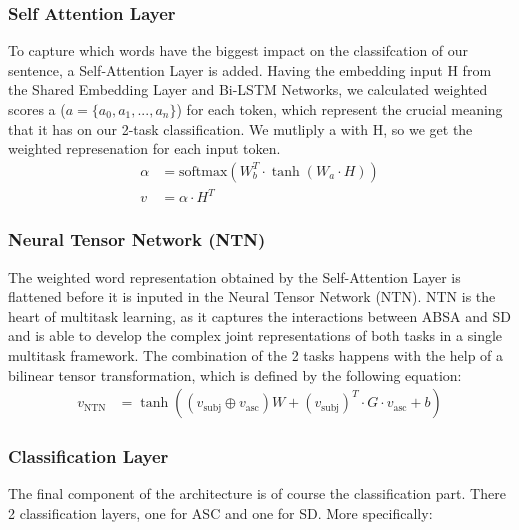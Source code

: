 \documentclass[a4paper,12pt]{article}
\begin{document}
\subsubsection{Self Attention Layer}
To capture which words have the biggest impact on the classifcation of our sentence, a Self-Attention Layer is added. Having the embedding input H from the Shared Embedding Layer and Bi-LSTM Networks, we calculated weighted scores a ($a=\{a_0,a_1,...,a_n\}$) for each token, which represent the crucial meaning that it has on our 2-task classification. We mutliply a with H, so we get the weighted represenation for each input token.
\begin{align}
\alpha &= \mathrm{softmax}\left(W_b^{T} \cdot \tanh\left(W_a \cdot H\right)\right) \\
v &= \alpha \cdot H^{T}
\end{align}

\subsubsection{Neural Tensor Network (NTN)}
The weighted word representation obtained by the Self-Attention Layer is flattened before it is inputed in the Neural Tensor Network (NTN). NTN is the heart of multitask learning, as it captures the interactions between ABSA and SD and is able to develop the complex joint representations of both tasks in a single multitask framework. The combination of the 2 tasks happens with the help of a bilinear tensor transformation, which is defined by the following equation:
\begin{align}
v_{\text{NTN}} &= \tanh\left((v_{\text{subj}} \oplus v_{\text{asc}}) W + (v_{\text{subj}})^{T} \cdot G \cdot v_{\text{asc}} + b \right)
\end{align}

\subsubsection{Classification Layer}
The final component of the architecture is of course the classification part. There 2 classification layers, one for ASC and one for SD. More specifically:
\end{document}

